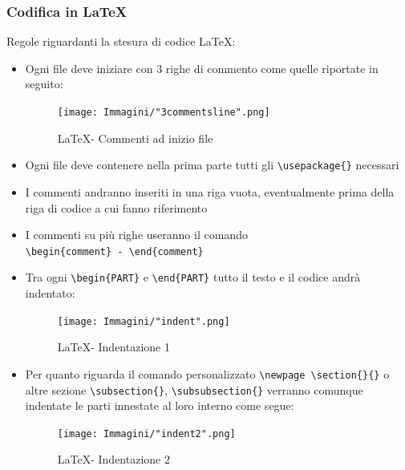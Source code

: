 \documentclass[a4paper]{article}
\begin{document}
		\subsubsection{Codifica in \LaTeX}
		Regole riguardanti la stesura di codice \LaTeX :
		\begin{itemize}
			\item Ogni file deve iniziare con 3 righe di commento come quelle riportate in seguito:
			\begin{figure}[H]
				\centering
				\texttt{[image: Immagini/"3commentsline".png]}
				\caption{\LaTeX \space - Commenti ad inizio file}
			\end{figure}
			\item Ogni file deve contenere nella prima parte tutti gli \verb|\usepackage{}| necessari
			\item I commenti andranno inseriti in una riga vuota, eventualmente prima della riga di
			codice a cui fanno riferimento
			\item I commenti su più righe useranno il comando \\ \verb|\begin{comment} - \end{comment}|
			\item Tra ogni \verb|\begin{PART}| e \verb|\end{PART}| tutto il testo e il codice andrà indentato:
			\begin{figure}[H]
				\centering
				\texttt{[image: Immagini/"indent".png]}
				\caption{\LaTeX \space - Indentazione 1}
			\end{figure}
			\item Per quanto riguarda il comando personalizzato \verb|\newpage \section{}{}| o altre sezione \verb|\subsection{}|, \verb|\subsubsection{}|
			verranno comunque indentate le parti innestate al loro interno come segue:
			\begin{figure}[H]
				\centering
				\texttt{[image: Immagini/"indent2".png]}
				\caption{\LaTeX \space - Indentazione 2}

\end{figure}
\end{itemize}
\end{document}
